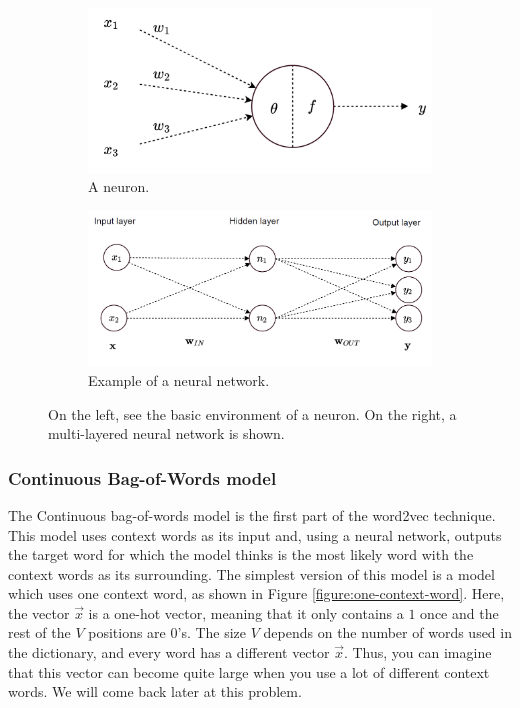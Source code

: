 \documentclass[a4paper,11pt]{article}
\begin{document}
\begin{figure}[h]
\begin{subfigure}{.5\textwidth}
  \centering
  \includegraphics[width=.8\linewidth]{Neuron.png}
  \caption{A neuron.}
  \label{figure:neuron}
\end{subfigure}%
\begin{subfigure}{.6\textwidth}
  \centering
  \includegraphics[width=.9\linewidth]{NeuralNetworkExample.png}
  \caption{Example of a neural network.}
  \label{figure:neuralnetwork}
\end{subfigure}
\caption{On the left, see the basic environment of a neuron. On the right, a multi-layered neural network is shown.}
\label{figure:NeuralNetworks}
\end{figure}

\subsubsection{Continuous Bag-of-Words model}
The Continuous bag-of-words model is the first part of the word2vec technique. This model uses context words as its input and, using a neural network, outputs the target word for which the model thinks is the most likely word with the context words as its surrounding. The simplest version of this model is a model which uses one context word, as shown in Figure \ref{figure:one-context-word}. Here, the vector $\vec{x}$ is a one-hot vector, meaning that it only contains a $1$ once and the rest of the $V$ positions are $0$'s. The size $V$ depends on the number of words used in the dictionary, and every word has a different vector $\vec{x}$. Thus, you can imagine that this vector can become quite large when you use a lot of different context words. We will come back later at this problem. %
\end{document}
